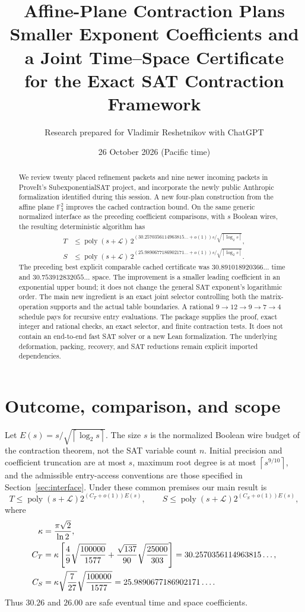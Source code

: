 \documentclass[11pt]{article}
\title{\textbf{Affine-Plane Contraction Plans}\\[4pt]
\large Smaller Exponent Coefficients and a Joint Time--Space Certificate\\
for the Exact SAT Contraction Framework}
\author{Research prepared for Vladimir Reshetnikov with ChatGPT}
\date{26 October 2026 (Pacific time)}
\theoremstyle{definition}\newtheorem{definition}[theorem]{Definition}
\theoremstyle{remark}\newtheorem{remark}[theorem]{Remark}
\newcommand{\poly}{\operatorname{poly}}
\newcommand{\F}{\mathbb F}
\newcommand{\ceil}[1]{\left\lceil#1\right\rceil}
\newcommand{\CT}{30.2570356114963815\ldots}
\newcommand{\CS}{25.9890677186902171\ldots}
\begin{document}
\maketitle
\begin{abstract}
We review twenty placed refinement packets and nine newer incoming packets in
ProveIt's SubexponentialSAT project, and incorporate the newly public Anthropic
formalization identified during this session. A new four-plan construction
from the affine plane $\F_3^2$ improves the cached contraction bound. On the
same generic normalized interface as the preceding coefficient comparisons,
with $s$ Boolean wires, the resulting deterministic algorithm has
\begin{align*}
 T&\le\poly(s+\mathcal L)\,2^{(\CT+o(1))s/\sqrt{\ceil{\log_2s}}},\\
 S&\le\poly(s+\mathcal L)\,2^{(\CS+o(1))s/\sqrt{\ceil{\log_2s}}}.
\end{align*}
The preceding best explicit comparable cached certificate was
$30.891018920366\ldots$ time and $30.753912832055\ldots$ space.
The improvement is a smaller leading coefficient in an exponential upper
bound; it does not change the general SAT exponent's logarithmic order.
The main new ingredient is an exact joint selector controlling both the
matrix-operation supports and the actual table boundaries. A rational
$9\to12\to9\to7\to4$ schedule pays for recursive entry evaluations.
The package supplies the proof, exact integer and rational checks, an exact
selector, and finite contraction tests. It does not contain an end-to-end
fast SAT solver or a new Lean formalization. The underlying deformation,
packing, recovery, and SAT reductions remain explicit imported dependencies.
\end{abstract}
\clearpage
\tableofcontents
\newpage

\section{Outcome, comparison, and scope}
\label{sec:outcome}

Let $E(s)=s/\sqrt{\ceil{\log_2s}}$. The size $s$ is the normalized Boolean
wire budget of the contraction theorem, not the SAT variable count $n$.
Initial precision and coefficient truncation are at most $s$, maximum root
degree is at most $\ceil{s^{9/10}}$, and the admissible entry-access conventions
are those specified in Section~\ref{sec:interface}. Under these common
premises our main result is
\begin{equation}\label{eq:main}
 T\le\poly(s+\mathcal L)2^{(C_T+o(1))E(s)},\qquad
 S\le\poly(s+\mathcal L)2^{(C_S+o(1))E(s)},
\end{equation}
where
\begin{align}
 \kappa&=\frac{\pi\sqrt2}{\ln2},\notag\\
 C_T&=\kappa\left[
  \frac49\sqrt{\frac{100000}{1577}}
  +\frac{\sqrt{137}}{90}\sqrt{\frac{25000}{303}}\right]
  =\CT,\label{eq:timeconstant}\\
 C_S&=\kappa\sqrt{\frac7{27}}\sqrt{\frac{100000}{1577}}
  =\CS.\label{eq:spaceconstant}
\end{align}
Thus $30.26$ and $26.00$ are safe eventual time and space coefficients.
\end{document}
